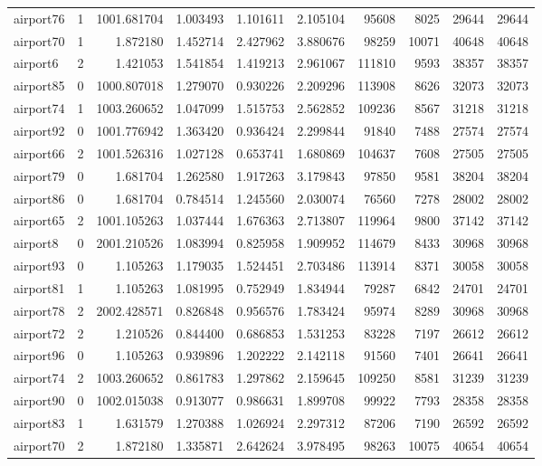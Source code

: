\begin{longtable}{|l|r|r|r|r|r|r|r|r|r|}
airport76 & 1 & 1001.681704 & 1.003493 & 1.101611 & 2.105104 & 95608 & 8025 & 29644 & 29644 \\
airport70 & 1 & 1.872180 & 1.452714 & 2.427962 & 3.880676 & 98259 & 10071 & 40648 & 40648 \\
airport6 & 2 & 1.421053 & 1.541854 & 1.419213 & 2.961067 & 111810 & 9593 & 38357 & 38357 \\
airport85 & 0 & 1000.807018 & 1.279070 & 0.930226 & 2.209296 & 113908 & 8626 & 32073 & 32073 \\
airport74 & 1 & 1003.260652 & 1.047099 & 1.515753 & 2.562852 & 109236 & 8567 & 31218 & 31218 \\
airport92 & 0 & 1001.776942 & 1.363420 & 0.936424 & 2.299844 & 91840 & 7488 & 27574 & 27574 \\
airport66 & 2 & 1001.526316 & 1.027128 & 0.653741 & 1.680869 & 104637 & 7608 & 27505 & 27505 \\
airport79 & 0 & 1.681704 & 1.262580 & 1.917263 & 3.179843 & 97850 & 9581 & 38204 & 38204 \\
airport86 & 0 & 1.681704 & 0.784514 & 1.245560 & 2.030074 & 76560 & 7278 & 28002 & 28002 \\
airport65 & 2 & 1001.105263 & 1.037444 & 1.676363 & 2.713807 & 119964 & 9800 & 37142 & 37142 \\
airport8 & 0 & 2001.210526 & 1.083994 & 0.825958 & 1.909952 & 114679 & 8433 & 30968 & 30968 \\
airport93 & 0 & 1.105263 & 1.179035 & 1.524451 & 2.703486 & 113914 & 8371 & 30058 & 30058 \\
airport81 & 1 & 1.105263 & 1.081995 & 0.752949 & 1.834944 & 79287 & 6842 & 24701 & 24701 \\
airport78 & 2 & 2002.428571 & 0.826848 & 0.956576 & 1.783424 & 95974 & 8289 & 30968 & 30968 \\
airport72 & 2 & 1.210526 & 0.844400 & 0.686853 & 1.531253 & 83228 & 7197 & 26612 & 26612 \\
airport96 & 0 & 1.105263 & 0.939896 & 1.202222 & 2.142118 & 91560 & 7401 & 26641 & 26641 \\
airport74 & 2 & 1003.260652 & 0.861783 & 1.297862 & 2.159645 & 109250 & 8581 & 31239 & 31239 \\
airport90 & 0 & 1002.015038 & 0.913077 & 0.986631 & 1.899708 & 99922 & 7793 & 28358 & 28358 \\
airport83 & 1 & 1.631579 & 1.270388 & 1.026924 & 2.297312 & 87206 & 7190 & 26592 & 26592 \\
airport70 & 2 & 1.872180 & 1.335871 & 2.642624 & 3.978495 & 98263 & 10075 & 40654 & 40654 \\

\end{longtable}
